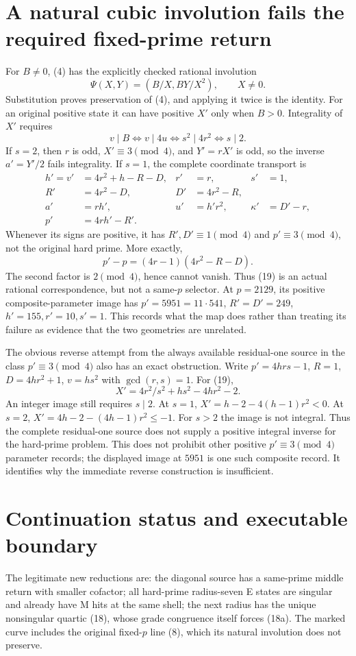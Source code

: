 \section{A natural cubic involution fails the required fixed-prime return}
For $B\ne0$, (4) has the explicitly checked rational involution
\[
 \Psi(X,Y)=(B/X,BY/X^2),\qquad X\ne0.                    \tag{19}
\]
Substitution proves preservation of (4), and applying it twice is the identity.
For an original positive state it can have positive $X'$ only when $B>0$.
Integrality of $X'$ requires
\[
 v\mid B\iff v\mid4u\iff s^2\mid4r^2\iff s\mid2.
\]
If $s=2$, then $r$ is odd, $X'\equiv3\pmod4$, and $Y'=rX'$ is odd, so the
inverse $a'=Y'/2$ fails integrality. If $s=1$, the complete coordinate transport is
\[
 \begin{aligned}
 h'=v'&=4r^2+h-R-D, & r'&=r, & s'&=1,\\
 R'&=4r^2-D, & D'&=4r^2-R,\\
 a'&=rh', & u'&=h'r^2, & \kappa'&=D'-r,\\
 p'&=4rh'-R'.
 \end{aligned}                                          \tag{20}
\]
Whenever its signs are positive, it has $R',D'\equiv1\pmod4$ and
$p'\equiv3\pmod4$, not the original hard prime. More exactly,
\[
 \boxed{p'-p=(4r-1)(4r^2-R-D).}                          \tag{21}
\]
The second factor is $2\pmod4$, hence cannot vanish.
Thus (19) is an actual rational correspondence, but not a same-$p$ selector.
At $p=2129$, its positive composite-parameter image has
$p'=5951=11\cdot541$, $R'=D'=249$,
$h'=155,r'=10,s'=1$. This records what the map does rather than treating its
failure as evidence that the two geometries are unrelated.

The obvious reverse attempt from the always available residual-one source in
the class $p'\equiv3\pmod4$ also has an exact obstruction. Write
$p'=4hrs-1$, $R=1$, $D=4hr^2+1$, $v=hs^2$ with $\gcd(r,s)=1$.
For (19),
\[
 X'=4r^2/s^2+hs^2-4hr^2-2.
\]
An integer image still requires $s\mid2$. At $s=1$,
$X'=h-2-4(h-1)r^2<0$. At $s=2$,
$X'=4h-2-(4h-1)r^2\le-1$. For $s>2$ the image is not integral.
Thus the complete residual-one source does not supply a positive integral
inverse for the hard-prime problem. This does not prohibit other positive
$p'\equiv3\pmod4$ parameter records; the displayed image at $5951$ is one such
composite record. It identifies why the immediate reverse construction is
insufficient.

\section{Continuation status and executable boundary}
The legitimate new reductions are: the diagonal source has a same-prime middle
return with smaller cofactor; all hard-prime radius-seven E states are singular
and already have M hits at the same shell; the next radius has the unique
nonsingular quartic (18), whose grade congruence itself forces (18a). The marked curve includes the original fixed-$p$ line
(8), which its natural involution does not preserve.

